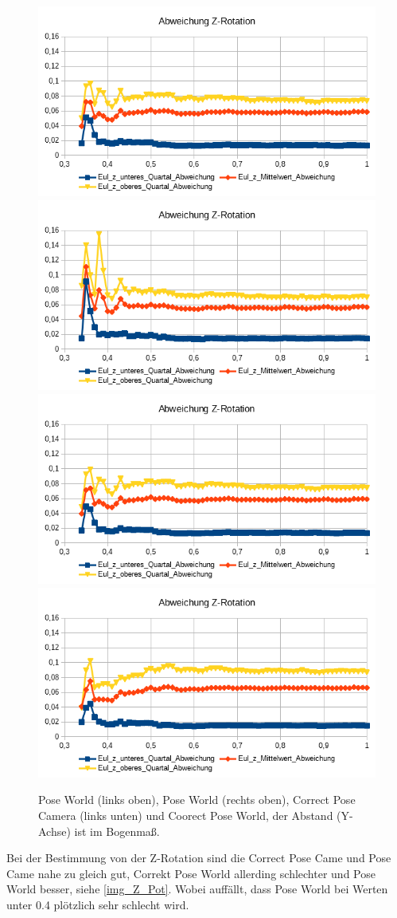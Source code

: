 \begin{figure}
	\centering
	\includegraphics[width=0.45\linewidth]{tabelle/Z_Rot_PC}
	\includegraphics[width=0.45\linewidth]{tabelle/Z_Rot_PW}
	\includegraphics[width=0.45\linewidth]{tabelle/Z_Rot_CPC}
	\includegraphics[width=0.45\linewidth]{tabelle/Z_Rot_CPW}
	\caption{Pose World (links oben), Pose World (rechts oben), Correct Pose Camera (links unten) und Coorect Pose World, der Abstand (Y-Achse) ist im Bogenmaß.}
	\label{img_Z_Pot}
\end{figure}
Bei der Bestimmung von der Z-Rotation sind die Correct Pose Came und Pose Came nahe zu gleich gut, Correkt Pose World allerding schlechter und Pose World besser, siehe \autoref{img_Z_Pot}. Wobei auffällt, dass Pose World bei Werten unter 0.4 plötzlich sehr schlecht wird.
